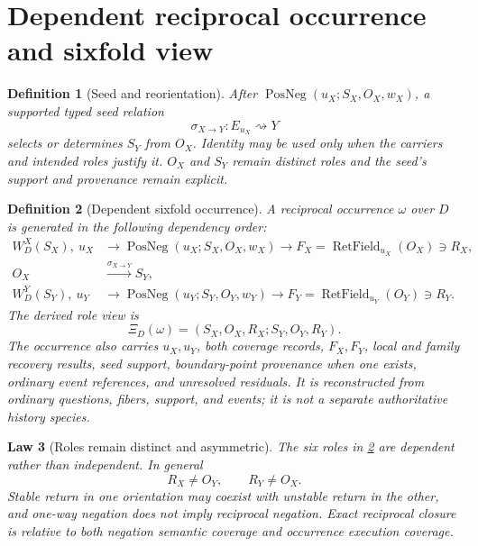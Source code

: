 \documentclass[11pt,oneside]{article}
\newtheorem{definition}{Definition}[section]
\newtheorem{law}[definition]{Law}
\newcommand{\RetField}{\operatorname{RetField}}
\newcommand{\PosNeg}{\operatorname{PosNeg}}
\begin{document}
\section{Dependent reciprocal occurrence and sixfold view}

\begin{definition}[Seed and reorientation]\label{def:reciprocal-seed}
After \(\PosNeg(u_X;S_X,O_X,w_X)\), a supported typed seed relation
\[
\sigma_{X\to Y}:E_{u_X}\rightsquigarrow Y
\]
selects or determines \(S_Y\) from \(O_X\).  Identity may be used only when the carriers and intended roles justify it.  \(O_X\) and \(S_Y\) remain distinct roles and the seed's support and provenance remain explicit.
\end{definition}

\begin{definition}[Dependent sixfold occurrence]\label{def:dependent-sixfold}
A reciprocal occurrence \(\omega\) over \(D\) is generated in the following dependency order:
\[
\boxed{
\begin{aligned}
W_D^X(S_X),\ u_X
&\longrightarrow
\PosNeg(u_X;S_X,O_X,w_X)
\longrightarrow
F_X=\RetField_{u_X}(O_X)
\ni R_X,\\
O_X
&\xrightarrow{\sigma_{X\to Y}}
S_Y,\\
W_D^Y(S_Y),\ u_Y
&\longrightarrow
\PosNeg(u_Y;S_Y,O_Y,w_Y)
\longrightarrow
F_Y=\RetField_{u_Y}(O_Y)
\ni R_Y.
\end{aligned}
}
\]
The derived role view is
\[
\boxed{\Xi_D(\omega)=(S_X,O_X,R_X;S_Y,O_Y,R_Y).}
\]
The occurrence also carries \(u_X,u_Y\), both coverage records, \(F_X,F_Y\), local and family recovery results, seed support, boundary-point provenance when one exists, ordinary event references, and unresolved residuals.  It is reconstructed from ordinary questions, fibers, support, and events; it is not a separate authoritative history species.
\end{definition}

\begin{law}[Roles remain distinct and asymmetric]\label{law:sixfold-role-distinction}
The six roles in \cref{def:dependent-sixfold} are dependent rather than independent.  In general
\[
R_X\neq O_Y,
\qquad
R_Y\neq O_X.
\]
Stable return in one orientation may coexist with unstable return in the other, and one-way negation does not imply reciprocal negation.  Exact reciprocal closure is relative to both negation semantic coverage and occurrence execution coverage.
\end{law}
\end{document}
